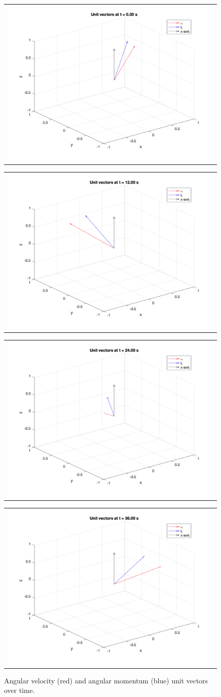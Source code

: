 \begin{figure}[H]
  \centering
  \begin{tabular}{@{}c@{}}
  \includegraphics[width=.49\linewidth]{Images/ps3_problem3_vectors_1.png}
  \end{tabular}
  \begin{tabular}{@{}c@{}}
  \includegraphics[width=.49\linewidth]{Images/ps3_problem3_vectors_121.png}
  \end{tabular}
  \begin{tabular}{@{}c@{}}
  \includegraphics[width=.49\linewidth]{Images/ps3_problem3_vectors_241.png}
  \end{tabular}
  \begin{tabular}{@{}c@{}}
  \includegraphics[width=.49\linewidth]{Images/ps3_problem3_vectors_361.png}
  \end{tabular}
  \caption{Angular velocity (red) and angular momentum (blue) unit vectors over time.}
  \label{fig:Body Axis Momentum Snapshots}
\end{figure}


